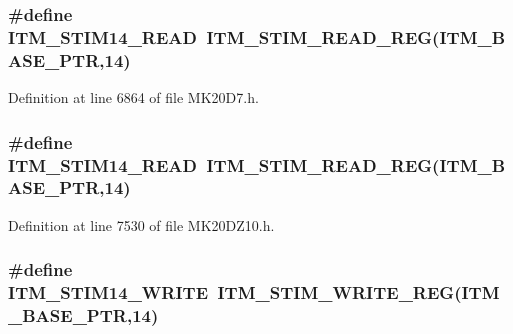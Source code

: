 \subsubsection[{\texorpdfstring{I\+T\+M\+\_\+\+S\+T\+I\+M14\+\_\+\+R\+E\+AD}{ITM_STIM14_READ}}]{\setlength{\rightskip}{0pt plus 5cm}\#define I\+T\+M\+\_\+\+S\+T\+I\+M14\+\_\+\+R\+E\+AD~{\bf I\+T\+M\+\_\+\+S\+T\+I\+M\+\_\+\+R\+E\+A\+D\+\_\+\+R\+EG}({\bf I\+T\+M\+\_\+\+B\+A\+S\+E\+\_\+\+P\+TR},14)}\hypertarget{group___i_t_m___register___accessor___macros_ga17048d30e461864d3d4ff5449fb8558f}{}\label{group___i_t_m___register___accessor___macros_ga17048d30e461864d3d4ff5449fb8558f}


Definition at line 6864 of file M\+K20\+D7.\+h.

\subsubsection[{\texorpdfstring{I\+T\+M\+\_\+\+S\+T\+I\+M14\+\_\+\+R\+E\+AD}{ITM_STIM14_READ}}]{\setlength{\rightskip}{0pt plus 5cm}\#define I\+T\+M\+\_\+\+S\+T\+I\+M14\+\_\+\+R\+E\+AD~{\bf I\+T\+M\+\_\+\+S\+T\+I\+M\+\_\+\+R\+E\+A\+D\+\_\+\+R\+EG}({\bf I\+T\+M\+\_\+\+B\+A\+S\+E\+\_\+\+P\+TR},14)}\hypertarget{group___i_t_m___register___accessor___macros_ga17048d30e461864d3d4ff5449fb8558f}{}\label{group___i_t_m___register___accessor___macros_ga17048d30e461864d3d4ff5449fb8558f}


Definition at line 7530 of file M\+K20\+D\+Z10.\+h.

\subsubsection[{\texorpdfstring{I\+T\+M\+\_\+\+S\+T\+I\+M14\+\_\+\+W\+R\+I\+TE}{ITM_STIM14_WRITE}}]{\setlength{\rightskip}{0pt plus 5cm}\#define I\+T\+M\+\_\+\+S\+T\+I\+M14\+\_\+\+W\+R\+I\+TE~{\bf I\+T\+M\+\_\+\+S\+T\+I\+M\+\_\+\+W\+R\+I\+T\+E\+\_\+\+R\+EG}({\bf I\+T\+M\+\_\+\+B\+A\+S\+E\+\_\+\+P\+TR},14)}\hypertarget{group___i_t_m___register___accessor___macros_ga74c1c1c1d5900b5c8553a289ddbab95b}{}\label{group___i_t_m___register___accessor___macros_ga74c1c1c1d5900b5c8553a289ddbab95b}


